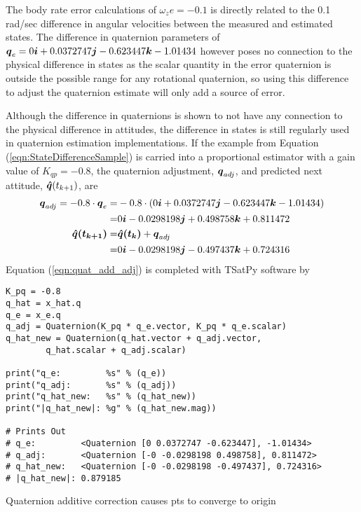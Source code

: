 The body rate error calculations of $\omega_ze = -0.1$ is directly related to the 0.1 rad/sec difference in angular velocities between the measured and estimated states.  The difference in quaternion parameters of $\boldsymbol{q}_e = 0 \boldsymbol{i} +0.0372747 \boldsymbol{j} -0.623447 \boldsymbol{k} -1.01434$ however poses no connection to the physical difference in states as the scalar quantity in the error quaternion is outside the possible range for any rotational quaternion, so using this difference to adjust the quaternion estimate will only add a source of error.

Although the difference in quaternions is shown to not have any connection to the physical difference in attitudes, the difference in states is still regularly used in quaternion estimation implementations.  If the example from Equation (\ref{eqn:StateDifferenceSample}) is carried into a proportional estimator with a gain value of $K_{qp} = -0.8$, the quaternion adjustment, $\boldsymbol{q}_{adj}$, and predicted next attitude, $\boldsymbol{\hat{q}}(t_{k+1})$, are
\begin{equation}
  \begin{aligned}
    \boldsymbol{q}_{adj} = -0.8 \cdot \boldsymbol{q}_e =& -0.8 \cdot (0 \boldsymbol{i} + 0.0372747 \boldsymbol{j} -0.623447 \boldsymbol{k} -1.01434 ) \\
                       =& 0 \boldsymbol{i} -0.0298198 \boldsymbol{j} +0.498758 \boldsymbol{k} +0.811472 \\
    \boldsymbol{\hat{q}(t_{k+1})} =& \boldsymbol{\hat{q}(t_{k})} + \boldsymbol{q}_{adj} \\
                       =& 0 \boldsymbol{i} -0.0298198 \boldsymbol{j} -0.497437 \boldsymbol{k} + 0.724316 \\
  \end{aligned}
  \label{eqn:quat_add_adj}
\end{equation}
Equation (\ref{eqn:quat_add_adj}) is completed with TSatPy software by
\begin{listing}
\begin{singlespace}
  \begin{verbatim}
K_pq = -0.8
q_hat = x_hat.q
q_e = x_e.q
q_adj = Quaternion(K_pq * q_e.vector, K_pq * q_e.scalar)
q_hat_new = Quaternion(q_hat.vector + q_adj.vector,
        q_hat.scalar + q_adj.scalar)

print("q_e:         %s" % (q_e))
print("q_adj:       %s" % (q_adj))
print("q_hat_new:   %s" % (q_hat_new))
print("|q_hat_new|: %g" % (q_hat_new.mag))

# Prints Out
# q_e:         <Quaternion [0 0.0372747 -0.623447], -1.01434>
# q_adj:       <Quaternion [-0 -0.0298198 0.498758], 0.811472>
# q_hat_new:   <Quaternion [-0 -0.0298198 -0.497437], 0.724316>
# |q_hat_new|: 0.879185
  \end{verbatim}
\caption{Quaternion additive correction causes pts to converge to origin}
\label{code:additive_correction}
\nocite{minted}
\end{singlespace}
\end{listing}

